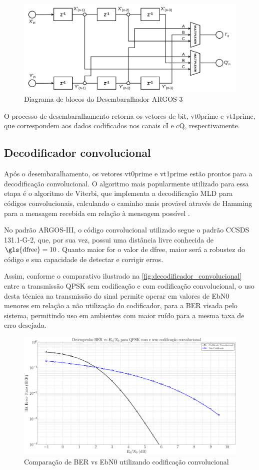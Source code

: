 \begin{figure}[H]
\centering
\caption{Diagrama de blocos do Desembaralhador ARGOS-3}\label{fig:desembaralhador}
\includegraphics[width=\linewidth]{assets/desembaralhador.pdf}
\end{figure}

O processo de desembaralhamento retorna os vetores de bit, \gls{vt0prime} e \gls{vt1prime}, que correspondem aos dados codificados nos canais \gls{cI} e \gls{cQ}, respectivamente.

\subsection{Decodificador convolucional}

Após o desembaralhamento, os vetores \gls{vt0prime} e \gls{vt1prime} estão prontos para a decodificação convolucional. O algoritmo mais popularmente utilizado para essa etapa é o algoritmo de Viterbi, que implementa a decodificação \gls{MLD} para códigos convolucionais, calculando o caminho mais provável através de \gls{Hamming} para a mensagem recebida em relação à mensagem possível \cite{cnes_services_and_message_formats_ed2_rev2_2006, rodrigues_demodulador_2018}.

No padrão \gls{ARGOS-III}, o código convolucional utilizado segue o padrão \gls{CCSDS} 131.1-G-2, que, por sua vez, possui uma distância livre conhecida de $\text{\gls{dfree}} = 10$. Quanto maior for o valor de \gls{dfree}, maior será a robustez do código e sua capacidade de detectar e corrigir erros.

\noindent Assim, conforme o comparativo ilustrado na \autoref{fig:decodificador_convolucional} entre a transmissão \gls{QPSK} sem codificação e com codificação convolucional, o uso desta técnica na transmissão do sinal permite operar em valores de \gls{EbN0} menores em relação a não utilização do codificador, para a \gls{BER} visada pelo sistema, permitindo uso em ambientes com maior ruído para a mesma taxa de erro desejada.

\begin{figure}[H]
	\centering
	\caption{Comparação de BER vs \gls{EbN0} utilizando codificação convolucional}\label{fig:decodificador_convolucional}
	\includegraphics[width=\linewidth]{assets/convolutional.pdf}
\end{figure}